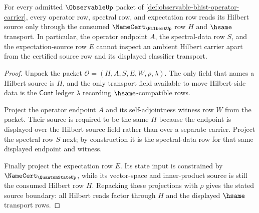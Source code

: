 \begin{theorem}
\label{thm:observable-hilbert-source-boundary}
For every admitted $\ObservableUp$ packet of
\autoref{def:observable-bhist-operator-carrier}, every operator row,
spectral row, and expectation row reads its Hilbert source only through the
consumed $\NameCert_{\HilbertUp}$ row $H$ and $\hsame$ transport. In
particular, the operator endpoint $A$, the spectral-data row $S$, and the
expectation-source row $E$ cannot inspect an ambient Hilbert carrier apart
from the certified source row and its displayed classifier transport.
\end{theorem}
\begin{proof}
Unpack the packet $\mathcal{O}=(H,A,S,E,W,\rho,\lambda)$. The only field that
names a Hilbert source is $H$, and the only transport field available to move
Hilbert-side data is the $\mathsf{Cont}$ ledger $\lambda$ recording
$\hsame$-compatible rows.

Project the operator endpoint $A$ and its self-adjointness witness row $W$
from the packet. Their source is required to be the same $H$ because the
endpoint is displayed over the Hilbert source field rather than over a
separate carrier. Project the spectral row $S$ next; by construction it is
the spectral-data row for that same displayed endpoint and witness.

Finally project the expectation row $E$. Its state input is constrained by
$\NameCert_{\QuantumStateUp}$, while its vector-space and inner-product
source is still the consumed Hilbert row $H$. Repacking these projections
with $\rho$ gives the stated source boundary: all Hilbert reads factor
through $H$ and the displayed $\hsame$ transport rows.
\end{proof}

